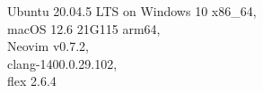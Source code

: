 Ubuntu 20.04.5 LTS on Windows 10 x86\_64, \\[0.5cm]
macOS 12.6 21G115 arm64, \\[0.5cm]
Neovim v0.7.2, \\[0.5cm]
clang-1400.0.29.102, \\[0.5cm]
flex 2.6.4 \\[0.5cm]
